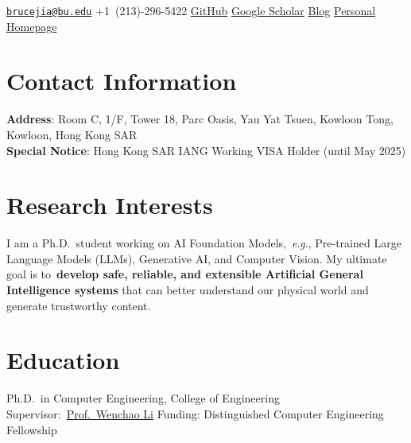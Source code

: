\documentclass{my_cv}
\newcommand{\eg}{\emph{e}.\emph{g}.}
\begin{document}
\hspace*{\fill}


\hspace*{\fill}

\longcontact
{\href{mailto:~brucejia@bu.edu}{\nolinkurl{brucejia@bu.edu}}}
{+1~(213)-296-5422}
{\href{https://github.com/SuperBruceJia}{GitHub}}
{\href{https://scholar.google.com/citations?user=PfpEP60AAAAJ&hl=en}{Google Scholar}}
{\href{http://shuyuej.com/blog}{Blog}}
{\href{https://shuyuej.com/}{Personal Homepage}}

\hspace*{\fill}

\setlength{\baselineskip}{16pt}


\section{\textbf{Contact Information}}
\noindent\textbf{Address}: Room C, 1/F, Tower 18, Parc Oasis, Yau Yat Tsuen, Kowloon Tong, Kowloon, Hong Kong SAR\\
\noindent\textbf{Special Notice}: Hong Kong SAR IANG Working VISA Holder (until May 2025)

\hspace*{\fill}


\section{\textbf{Research Interests}}
\noindent I am a Ph.D.~student working on AI Foundation Models,~\eg, Pre-trained Large Language Models (LLMs), Generative AI, and Computer Vision. My ultimate goal is to~\textbf{develop safe, reliable, and extensible Artificial General Intelligence systems} that can better understand our physical world and generate trustworthy content.

\hspace*{\fill}


\section{\textbf{Education}}
\workitemsthree
{Ph.D.~in Computer Engineering, College of Engineering}
{Supervisor:~\href{https://www.bu.edu/eng/profile/39799/}{Prof.~Wenchao Li}}
{Funding: Distinguished Computer Engineering Fellowship}
\end{document}
